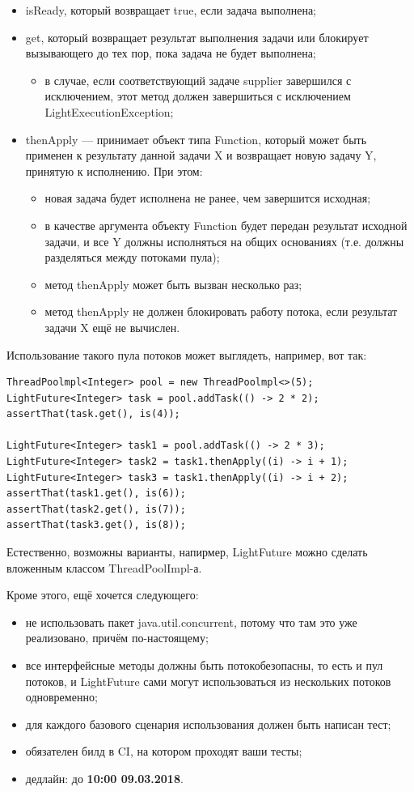 \documentclass[a5paper]{article}
\begin{document}
\begin{itemize}
	\item isReady, который возвращает true, если задача выполнена;
	\item get, который возвращает результат выполнения задачи или блокирует вызывающего до тех пор, пока задача не будет выполнена;
	\begin{itemize}
		\item в случае, если соответствующий задаче supplier завершился с исключением, этот метод должен завершиться с исключением LightExecutionException;
	\end{itemize}
	\item thenApply --- принимает объект типа Function, который может быть применен к результату данной задачи X и возвращает новую задачу Y, принятую к исполнению. При этом:
	\begin{itemize}
		\item новая задача будет исполнена не ранее, чем завершится исходная;
		\item в качестве аргумента объекту Function будет передан результат исходной задачи, и все Y должны исполняться на общих основаниях (т.е. должны разделяться между потоками пула);
		\item метод thenApply может быть вызван несколько раз;
		\item метод thenApply не должен блокировать работу потока, если результат задачи X ещё не вычислен.
	\end{itemize}
\end{itemize}

Использование такого пула потоков может выглядеть, например, вот так:
\begin{verbatim}
ThreadPoolmpl<Integer> pool = new ThreadPoolmpl<>(5);
LightFuture<Integer> task = pool.addTask(() -> 2 * 2);
assertThat(task.get(), is(4));

LightFuture<Integer> task1 = pool.addTask(() -> 2 * 3);
LightFuture<Integer> task2 = task1.thenApply((i) -> i + 1);
LightFuture<Integer> task3 = task1.thenApply((i) -> i + 2);
assertThat(task1.get(), is(6));
assertThat(task2.get(), is(7));
assertThat(task3.get(), is(8));
\end{verbatim}

Естественно, возможны варианты, напирмер, LightFuture можно сделать вложенным классом ThreadPoolImpl-а.

Кроме этого, ещё хочется следующего:
\begin{itemize}
	\item не использовать пакет java.util.concurrent, потому что там это уже реализовано, причём по-настоящему;
	\item все интерфейсные методы должны быть потокобезопасны, то есть и пул потоков, и LightFuture сами могут использоваться из нескольких потоков одновременно;
	\item для каждого базового сценария использования должен быть написан тест;
	\item обязателен билд в CI, на котором проходят ваши тесты;
	\item дедлайн: до \textbf{10:00 09.03.2018}.
\end{itemize}
\end{document}

